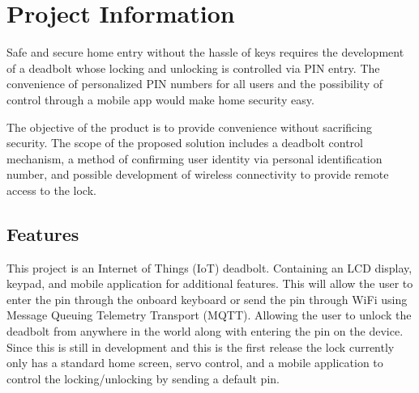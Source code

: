 \chapter{Project Information}
Safe and secure home entry without the hassle of keys requires the development of a deadbolt whose locking and unlocking is controlled via PIN entry. The convenience of personalized PIN numbers for all users and the possibility of control through a mobile app would make home security easy.

The objective of the product is to provide convenience without sacrificing security. The scope of the proposed solution includes a deadbolt control mechanism, a method of confirming user identity via personal identification number, and possible development of wireless connectivity to provide remote access to the lock.


\section{Features}
This project is an Internet of Things (IoT) deadbolt. Containing an LCD display, keypad, and mobile application for additional features. This will allow the user to enter the pin through the onboard keyboard or send the pin through WiFi using Message Queuing Telemetry Transport (MQTT). Allowing the user to unlock the deadbolt from anywhere in the world along with entering the pin on the device.
Since this is still in development and this is the first release the lock currently only has a standard home screen, servo control, and a mobile application to control the locking/unlocking by sending a default pin.

